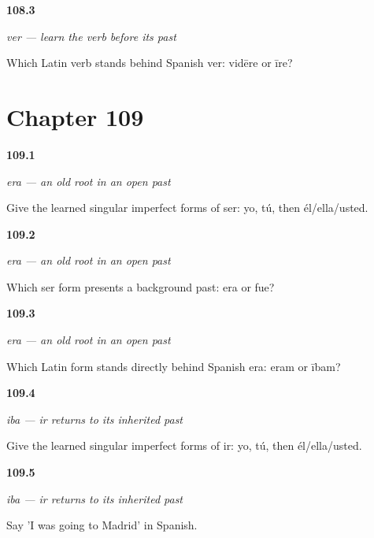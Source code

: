 \noindent\begin{minipage}[t]{\linewidth}
\raggedright
\hypertarget{review-ES-C16-ver-history}{\textbf{108.3}} \emph{ver — learn the verb before its past}\par
\small Which Latin verb stands behind Spanish ver: vidēre or īre?
\end{minipage}\par\medskip

\section*{Chapter 109}

\noindent\begin{minipage}[t]{\linewidth}
\raggedright
\hypertarget{review-ES-C16-ser-imperfecto-singular-forms}{\textbf{109.1}} \emph{era — an old root in an open past}\par
\small Give the learned singular imperfect forms of ser: yo, tú, then él/ella/usted.
\end{minipage}\par\medskip

\noindent\begin{minipage}[t]{\linewidth}
\raggedright
\hypertarget{review-ES-C16-ser-imperfecto-era-fue}{\textbf{109.2}} \emph{era — an old root in an open past}\par
\small Which ser form presents a background past: era or fue?
\end{minipage}\par\medskip

\noindent\begin{minipage}[t]{\linewidth}
\raggedright
\hypertarget{review-ES-C16-ser-imperfecto-history}{\textbf{109.3}} \emph{era — an old root in an open past}\par
\small Which Latin form stands directly behind Spanish era: eram or ībam?
\end{minipage}\par\medskip

\noindent\begin{minipage}[t]{\linewidth}
\raggedright
\hypertarget{review-ES-C16-ir-imperfecto-singular-forms}{\textbf{109.4}} \emph{iba — ir returns to its inherited past}\par
\small Give the learned singular imperfect forms of ir: yo, tú, then él/ella/usted.
\end{minipage}\par\medskip

\noindent\begin{minipage}[t]{\linewidth}
\raggedright
\hypertarget{review-ES-C16-ir-imperfecto-iba-madrid}{\textbf{109.5}} \emph{iba — ir returns to its inherited past}\par
\small Say 'I was going to Madrid' in Spanish.
\end{minipage}\par\medskip

